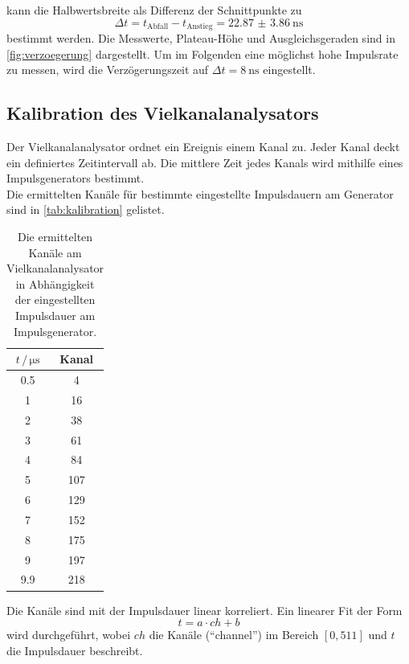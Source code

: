 kann die Halbwertsbreite als Differenz der Schnittpunkte zu
\begin{equation}
    \Delta t = t_\text{Abfall} - t_\text{Anstieg} = \qty{22.87(386)}{\nano\second}
\end{equation}
bestimmt werden.
Die Messwerte, Plateau-Höhe und Ausgleichsgeraden sind in \autoref{fig:verzoegerung} dargestellt.
Um im Folgenden eine möglichst hohe Impulsrate zu messen, wird die Verzögerungszeit auf $\Delta t = \qty{8}{\nano\second}$ eingestellt.%
\FloatBarrier

\subsection{Kalibration des Vielkanalanalysators}
Der Vielkanalanalysator ordnet ein Ereignis einem Kanal zu.
Jeder Kanal deckt ein definiertes Zeitintervall ab.
Die mittlere Zeit jedes Kanals wird mithilfe eines Impulsgenerators bestimmt.
\\
Die ermittelten Kanäle für bestimmte eingestellte Impulsdauern am Generator sind in \autoref{tab:kalibration} gelistet.
\begin{table}
    \centering
    \caption{Die ermittelten Kanäle am Vielkanalanalysator in Abhängigkeit der eingestellten Impulsdauer am Impulsgenerator.}
    \label{tab:kalibration}
    \begin{tabular}{cc}
        \toprule
        $t \,/\, \unit{\micro\second}$ & Kanal \\
        \midrule
        0.5 & 4 \\
        1 & 16 \\
        2 & 38 \\
        3 & 61 \\
        4 & 84 \\
        5 & 107 \\
        6 & 129 \\
        7 & 152 \\
        8 & 175 \\
        9 & 197 \\
        9.9 & 218 \\
        \bottomrule
    \end{tabular}
\end{table}
Die Kanäle sind mit der Impulsdauer linear korreliert.
Ein linearer Fit der Form
\begin{equation}
    t = a \cdot ch + b
    \label{eqn:fit_kanal}
\end{equation}
wird durchgeführt, wobei $ch$ die Kanäle ("`channel"') im Bereich $[0, 511]$ und $t$ die Impulsdauer beschreibt.
